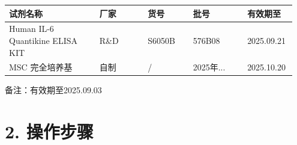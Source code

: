\documentclass[UTF8,10pt,a4paper,fontset=fandol]{ctexart}
\newcommand{\fieldvalue}[1]{#1}
\newcommand{\handwritten}[1]{#1}
\begin{document}
\begin{center}
\small
\begin{tabular}{|p{0.30\linewidth}|p{0.16\linewidth}|p{0.15\linewidth}|p{0.18\linewidth}|p{0.16\linewidth}|}
\hline
试剂名称 & 厂家 & 货号 & 批号 & 有效期至\\
\hline
\fieldvalue{Human IL-6 Quantikine ELISA KIT} &
\fieldvalue{R\&D} &
\fieldvalue{S6050B} &
\fieldvalue{\handwritten{576B08}} &
\fieldvalue{\handwritten{2025.09.21}}\\
\hline
\fieldvalue{MSC 完全培养基} &
\fieldvalue{自制} &
\fieldvalue{/} &
\fieldvalue{\handwritten{2025年...}} &
\fieldvalue{\handwritten{2025.10.20}}\\
\hline
\end{tabular}
\end{center}

\noindent 备注：\fieldvalue{\handwritten{有效期至2025.09.03}}

\section*{2. 操作步骤}
\end{document}
